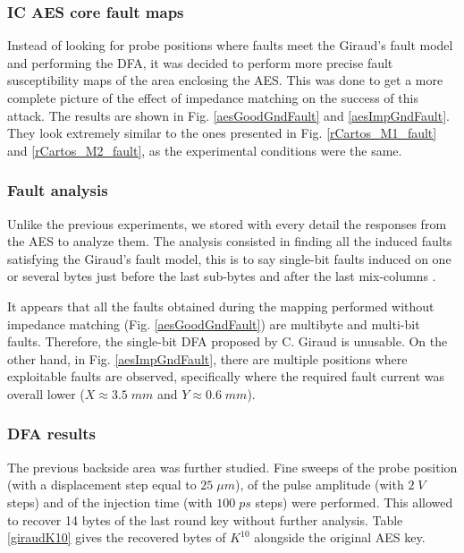 \documentclass[10pt, conference, compsocconf]{IEEEtran}
\begin{document}
\subsubsection{IC AES core fault maps}
\label{subsubsection:aesFault}

Instead of looking for probe positions where faults meet the Giraud's fault model and performing the DFA, it was decided to perform more precise fault susceptibility maps of the area enclosing the AES. This was done to get a more complete picture of the effect of impedance matching on the success of this attack.
The results are shown in Fig. \ref{aesGoodGndFault} and \ref{aesImpGndFault}. They look extremely similar to the ones presented in Fig. \ref{rCartos_M1_fault} and \ref{rCartos_M2_fault}, as the experimental conditions were the same.

\subsubsection{Fault analysis}
\label{subsubsection:faultAnalysis}

Unlike the previous experiments, we stored with every detail the responses from the AES to analyze them.
The analysis consisted in finding all the induced faults satisfying the Giraud's fault model, this is to say single-bit faults induced on one or several bytes just before the last sub-bytes and after the last mix-columns \cite{giraud}.

It appears that all the faults obtained during the mapping performed without impedance matching (Fig. \ref{aesGoodGndFault}) are multibyte and multi-bit faults.
Therefore, the single-bit DFA proposed by C. Giraud is unusable.
On the other hand, in Fig. \ref{aesImpGndFault}, there are multiple positions where exploitable faults are observed, specifically where the required fault current was overall lower ($X\approx 3.5\;mm$ and $Y\approx 0.6\;mm$).

\subsubsection{DFA results}
\label{subsubsection:DFAres}

The previous backside area was further studied. Fine sweeps of the probe position (with a displacement step equal to $25 \; \mu m$), of the pulse amplitude (with $2 \; V$ steps) and of the injection time (with $100 \; ps$ steps) were performed.
This allowed to recover 14 bytes of the last round key without further analysis.
Table \ref{giraudK10} gives the recovered bytes of $K^{10}$ alongside the original AES key.
\end{document}
